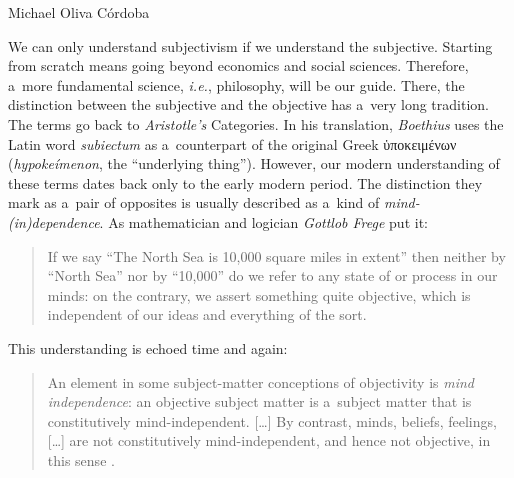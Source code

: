 \begin{artengenv}{Michael Oliva Córdoba}

We can only understand subjectivism if we understand the subjective. Starting from scratch means going beyond economics and social sciences. Therefore, a~more fundamental science, \textit{i.e.}, philosophy, will be our guide. There, the distinction between the subjective and the objective has a~very long tradition. The terms go back to \textit{Aristotle's} Categories. In his translation, \textit{Boethius} 
\parencites[cf.][5:22]{minio-paluello_aristoteles_1961}[][\textit{Cat.} 1a20]{aristotle_categories_1938} %
 uses the Latin word \textit{subiectum} as a~counterpart of the original Greek \textgreek{ὑποκειμένων}
 (\textit{hypokeímenon}, the ``underlying thing''). However, our modern understanding of these terms dates back only to the early modern period. The distinction they mark as a~pair of opposites is usually described as a~kind of \textit{mind-(in)dependence}. As mathematician and logician \textit{Gottlob Frege} put it:



\begin{quote}
If we say ``The North Sea is 10,000 square miles in extent'' then neither by ``North Sea'' nor by ``10,000'' do we refer to any state of or process in our minds: on the contrary, we assert something quite objective, which is independent of our ideas and everything of the sort. 
\parencite[][p.34]{frege_foundations_1953}%
\end{quote}




\noindent This understanding is echoed time and again:



\begin{quote}
An element in some subject-matter conceptions of objectivity is \textit{mind independence}: an objective subject matter is a~subject matter that is constitutively mind-independent. […] By contrast, minds, beliefs, feelings, […] are not constitutively mind-independent, and hence not objective, in this sense 
\parencite[][p.46]{burge_origins_2010}.%
\end{quote}





\end{artengenv}
